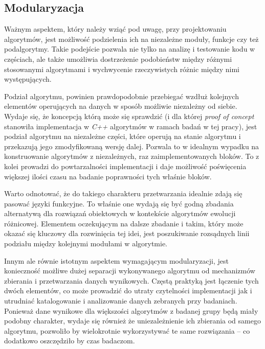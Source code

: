 \documentclass[12pt,a4paper]{report}
\begin{document}
{{{{{{\subsection{Modularyzacja}
\label{modlsubs}
\par{
Ważnym aspektem, który należy wziąć pod uwagę, przy projektowaniu algorytmów, jest możliwość podzielenia ich na niezależne moduły, funkcje czy też podalgorytmy. Takie podejście pozwala nie tylko na analizę i testowanie kodu w częściach, ale także umożliwia dostrzeżenie podobieństw między różnymi stosowanymi algorytmami i wychwycenie rzeczywistych różnic między nimi występujących.
}
\par{
Podział algorytmu, powinien prawdopodobnie przebiegać wzdłuż kolejnych elementów operujących na danych w sposób możliwie niezależny od siebie. Wydaje się, że koncepcją którą może się sprawdzić (i dla której \emph{proof of concept} stanowiła implementacja w \emph{C++} algorytmów w ramach badań w tej pracy), jest podział algorytmu na niezależne części, które operują na stanie algorytmu i przekazują jego zmodyfikowaną wersję dalej. Pozwala to w idealnym wypadku na konstruowanie algorytmów z niezależnych, raz zaimplementowanych bloków. To z kolei prowadzi do powtarzalności implementacji i daje możliwość poświęcenia większej ilości czasu na badanie poprawności tych właśnie bloków.
}
\par{
Warto odnotować, że do takiego charakteru przetwarzania idealnie zdają się pasować języki funkcyjne. To właśnie one wydają się być godną zbadania alternatywą dla rozwiązań obiektowych w kontekście algorytmów ewolucji różnicowej. Elementem oczekującym na dalsze zbadanie i takim, który może okazać się kluczowy dla rozwinięcia tej idei, jest poszukiwanie rozsądnych linii podziału między kolejnymi modułami w algorytmie.
}
\par{
Innym ale równie istotnym aspektem wymagającym modularyzacji, jest konieczność możliwe dużej separacji wykonywanego algorytmu od mechanizmów zbierania i przetwarzania danych wynikowych. Częstą praktyką jest łączenie tych dwóch elementów, co może prowadzić do utraty czytelności implementacji jak i utrudniać katalogowanie i analizowanie danych zebranych przy badaniach. Ponieważ dane wynikowe dla większości algorytmów z badanej grupy będą miały podobny charakter, wydaje się również że uniezależnienie ich zbierania od samego algorytmu, pozwoliło by wielokrotnie wykorzystywać te same rozwiązania -- co dodatkowo oszczędziło by czas badaczom.
}
}}}}}}
\end{document}
